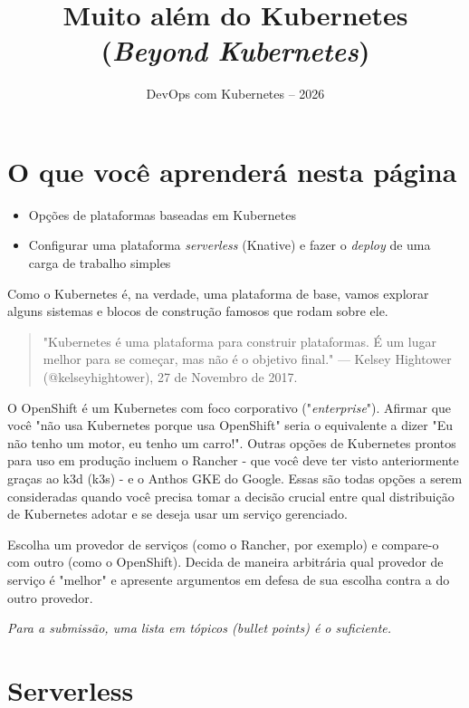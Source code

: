 \documentclass[11pt,a4paper]{article}
\title{\color{secondary}\Huge\textbf{Muito além do Kubernetes (\textit{Beyond Kubernetes})}}
\author{\color{primary}DevOps com Kubernetes -- 2026}
\date{}
\begin{document}
\maketitle

\section*{\color{primary}O que você aprenderá nesta página}
\begin{itemize}
    \item Opções de plataformas baseadas em Kubernetes
    \item Configurar uma plataforma \textit{serverless} (Knative) e fazer o \textit{deploy} de uma carga de trabalho simples
\end{itemize}

Como o Kubernetes é, na verdade, uma plataforma de base, vamos explorar alguns sistemas e blocos de construção famosos que rodam sobre ele.

\begin{quote}
"Kubernetes é uma plataforma para construir plataformas. É um lugar melhor para se começar, mas não é o objetivo final." — Kelsey Hightower (@kelseyhightower), 27 de Novembro de 2017.
\end{quote}

O OpenShift é um Kubernetes com foco corporativo ("\textit{enterprise}"). Afirmar que você "não usa Kubernetes porque usa OpenShift" seria o equivalente a dizer "Eu não tenho um motor, eu tenho um carro!". Outras opções de Kubernetes prontos para uso em produção incluem o Rancher - que você deve ter visto anteriormente graças ao k3d (k3s) - e o Anthos GKE do Google. Essas são todas opções a serem consideradas quando você precisa tomar a decisão crucial entre qual distribuição de Kubernetes adotar e se deseja usar um serviço gerenciado.

\begin{tcolorbox}[colback=blue!5!white,colframe=blue!75!black,title=Exercício 5.5: Comparação de Plataformas]
Escolha um provedor de serviços (como o Rancher, por exemplo) e compare-o com outro (como o OpenShift). Decida de maneira arbitrária qual provedor de serviço é "melhor" e apresente argumentos em defesa de sua escolha contra a do outro provedor. 

\textit{Para a submissão, uma lista em tópicos (bullet points) é o suficiente.}
\end{tcolorbox}

\section*{\color{primary}Serverless}
\end{document}
